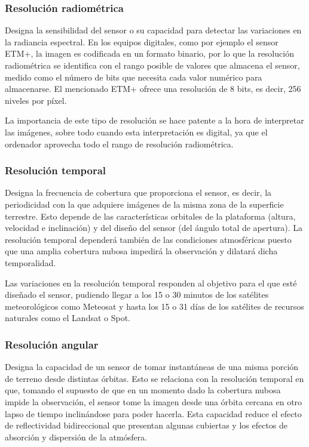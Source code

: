 \subsubsection{Resolución radiométrica}
Designa la sensibilidad del sensor o su capacidad para detectar las variaciones en la radiancia espectral. En los equipos digitales, como por ejemplo el sensor \ac{ETM+}, la imagen es codificada en un formato binario, por lo que la resolución radiométrica se identifica con el rango posible de valores que almacena el sensor, medido como el número de bits que necesita cada valor numérico para almacenarse. El mencionado \ac{ETM+} ofrece una resolución de 8 bits, es decir, 256 niveles por píxel.\Sep

La importancia de este tipo de resolución se hace patente a la hora de interpretar las imágenes, sobre todo cuando esta interpretación es digital, ya que el ordenador aprovecha todo el rango de resolución radiométrica.

\subsubsection{Resolución temporal}
Designa la frecuencia de cobertura que proporciona el sensor, es decir, la periodicidad con la que adquiere imágenes de la misma zona de la superficie terrestre. Esto depende de las características orbitales de la plataforma (altura, velocidad e inclinación) y del diseño del sensor (del ángulo total de apertura). La resolución temporal dependerá también de las condiciones atmosféricas puesto que una amplia cobertura nubosa impedirá la observación y dilatará dicha temporalidad.\Sep

Las variaciones en la resolución temporal responden al objetivo para el que esté diseñado el sensor, pudiendo llegar a los 15 o 30 minutos de los satélites meteorológicos como Meteosat y hasta los 15 o 31 días de los satélites de recursos naturales como el Landsat o Spot.

\subsubsection{Resolución angular}
Designa la capacidad de un sensor de tomar instantáneas de una misma porción de terreno desde distintas órbitas. Esto se relaciona con la resolución temporal en que, tomando el supuesto de que en un momento dado la cobertura nubosa impide la observación, el sensor tome la imagen desde una órbita cercana en otro lapso de tiempo inclinándose para poder hacerla. Esta capacidad reduce el efecto de reflectividad bidireccional que presentan algunas cubiertas y los efectos de absorción y dispersión de la atmósfera.\Sep

